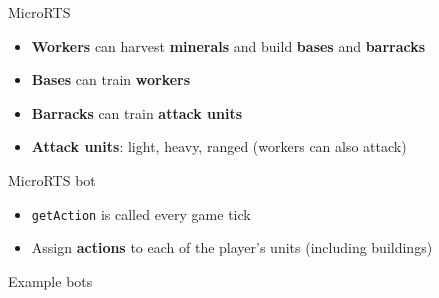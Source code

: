 \begin{frame}{MicroRTS}
    \begin{itemize}
        \pause\item \textbf{Workers} can harvest \textbf{minerals} and build \textbf{bases} and \textbf{barracks}
        \pause\item \textbf{Bases} can train \textbf{workers}
        \pause\item \textbf{Barracks} can train \textbf{attack units}
        \pause\item \textbf{Attack units}: light, heavy, ranged (workers can also attack)
    \end{itemize}
\end{frame}

\begin{frame}{MicroRTS bot}
    \begin{itemize}
        \pause\item \lstinline{getAction} is called every game tick
        \pause\item Assign \textbf{actions} to each of the player's units (including buildings)
    \end{itemize}
\end{frame}

\begin{frame}{Example bots}
\end{frame}
